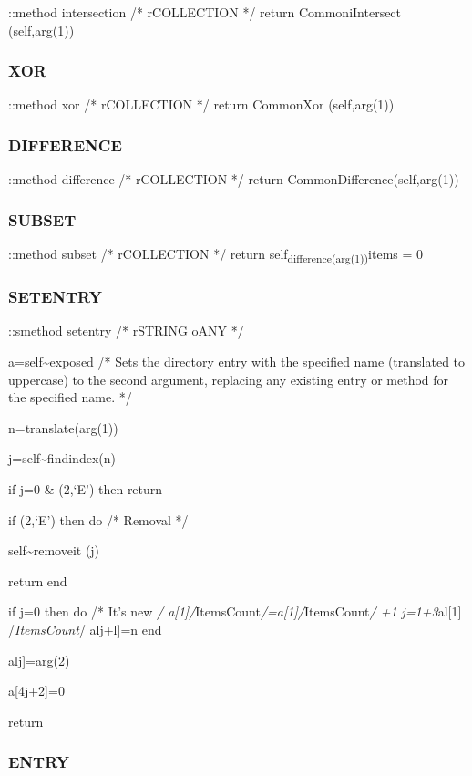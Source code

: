 ::method intersection /* rCOLLECTION */ return CommoniIntersect
(self,arg(1))

\subsubsection{XOR}\label{xor-4}

::method xor /* rCOLLECTION */ return CommonXor (self,arg(1))

\subsubsection{DIFFERENCE}\label{difference-4}

::method difference /* rCOLLECTION */ return
CommonDifference(self,arg(1))

\subsubsection{SUBSET}\label{subset-2}

::method subset /* rCOLLECTION */ return
self\textsubscript{difference(arg(1))}items = 0

\subsubsection{SETENTRY}\label{setentry}

::smethod setentry /* rSTRING oANY */

a=self\textasciitilde exposed /* Sets the directory entry with the
specified name (translated to uppercase) to the second argument,
replacing any existing entry or method for the specified name. */

n=translate(arg(1))

j=self\textasciitilde findindex(n)

if j=0 \& \arg(2,`E') then return

if \arg(2,`E') then do /* Removal */

self\textasciitilde removeit (j)

return end

if j=0 then do /* It's new \emph{/
a{[}1{]}/}ItemsCount\emph{/=a{[}1{]}/}ItemsCount\emph{/ +1
j=1+3}al{[}1{]} /\emph{ItemsCount}/ alj+l{]}=n end

alj{]}=arg(2)

a{[}4j+2{]}=0

return

\subsubsection{ENTRY}\label{entry}

